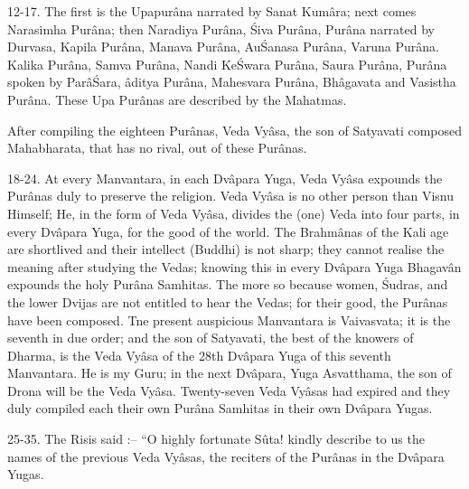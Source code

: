 12-17. The first is the Upapur\^ana narrated by Sanat Kum\^ara; next comes Narasimha Pur\^ana; then Naradiya Pur\^ana, \'Siva Pur\^ana, Pur\^ana narrated by Durvasa, Kapila Pur\^ana, Manava Pur\^ana, Au\'Sanasa Pur\^ana, Varuna Pur\^ana. Kalika Pur\^ana, Samva Pur\^ana, Nandi Ke\'Swara Pur\^ana, Saura Pur\^ana, Pur\^ana spoken by Par\^a\'Sara, \^aditya Pur\^ana, Mahesvara Pur\^ana, Bh\^agavata and Vasistha Pur\^ana. These Upa Pur\^anas are described by the Mahatmas.

After compiling the eighteen Pur\^anas, Veda Vy\^asa, the son of Satyavati composed Mahabharata, that has no rival, out of these Pur\^anas.

18-24. At every Manvantara, in each Dv\^apara Yuga, Veda Vy\^asa expounds the Pur\^anas duly to preserve the religion. Veda Vy\^asa is no other person than Visnu Himself; He, in the form of Veda Vy\^asa, divides the (one) Veda into four parts, in every Dv\^apara Yuga, for the good of the world. The Brahm\^anas of the Kali age are shortlived and their intellect (Buddhi) is not sharp; they cannot realise the meaning after studying the Vedas; knowing this in every Dv\^apara Yuga Bhagav\^an expounds the holy Pur\^ana Samhitas. The more so because women, \'Sudras, and the lower Dvijas are not entitled to hear the Vedas; for their good, the Pur\^anas have been composed. Tne present auspicious Manvantara is Vaivasvata; it is the seventh in due order; and the son of Satyavati, the best of the knowers of Dharma, is the Veda Vy\^asa of the 28th Dv\^apara Yuga of this seventh Manvantara. He is my Guru; in the next Dv\^apara, Yuga Asvatthama, the son of Drona will be the Veda Vy\^asa. Twenty-seven Veda Vy\^asas had expired and they duly compiled each their own Pur\^ana Samhitas in their own Dv\^apara Yugas.

25-35. The Risis said :-- ``O highly fortunate S\^uta! kindly describe to us the names of the previous Veda Vy\^asas, the reciters of the Pur\^anas in the Dv\^apara Yugas.

